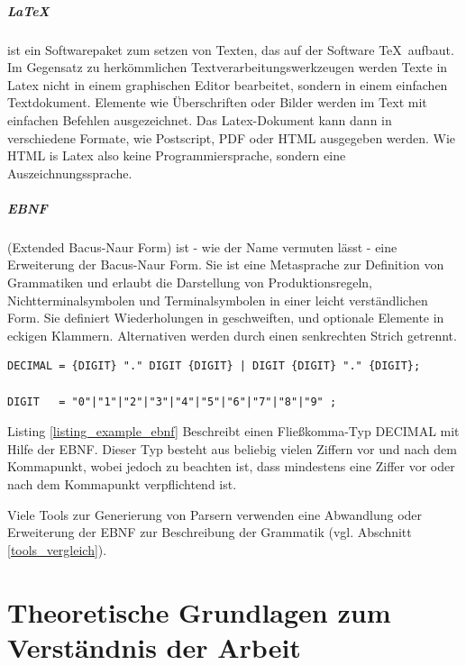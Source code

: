 \paragraph*{\LaTeX} ist ein Softwarepaket zum setzen von Texten, das auf der Software \TeX \ aufbaut. Im Gegensatz zu herkömmlichen Textverarbeitungswerkzeugen werden Texte in Latex nicht in einem graphischen Editor bearbeitet, sondern in einem einfachen Textdokument. Elemente wie Überschriften oder Bilder werden im Text mit einfachen Befehlen ausgezeichnet. Das Latex-Dokument kann dann in verschiedene Formate, wie Postscript, PDF oder HTML ausgegeben werden. Wie HTML is Latex also keine Programmiersprache, sondern eine Auszeichnungssprache.


\paragraph*{EBNF}
(Extended Bacus-Naur Form) ist - wie der Name vermuten lässt - eine Erweiterung der Bacus-Naur Form. Sie ist eine Metasprache zur Definition von Grammatiken und erlaubt die Darstellung von Produktionsregeln, Nichtterminalsymbolen und Terminalsymbolen in einer leicht verständlichen Form\cite{NiWi77}. Sie definiert Wiederholungen in geschweiften, und optionale Elemente in eckigen Klammern. Alternativen werden durch einen senkrechten Strich getrennt. 

\begin{lstlisting}[float = htbp,caption={Beschreibung eines Fließkomma-Typs in EBNF.},label=listing_example_ebnf]
DECIMAL = {DIGIT} "." DIGIT {DIGIT} | DIGIT {DIGIT} "." {DIGIT};

DIGIT   = "0"|"1"|"2"|"3"|"4"|"5"|"6"|"7"|"8"|"9" ;
\end{lstlisting}

Listing \ref{listing_example_ebnf} Beschreibt einen Fließkomma-Typ DECIMAL mit Hilfe der EBNF. Dieser Typ besteht aus beliebig vielen Ziffern vor und nach dem Kommapunkt, wobei jedoch zu beachten ist, dass mindestens eine Ziffer vor oder nach dem Kommapunkt verpflichtend ist.

Viele Tools zur Generierung von Parsern verwenden eine Abwandlung oder Erweiterung der EBNF zur Beschreibung der Grammatik (vgl. Abschnitt \ref{tools_vergleich}).




\chapter{Theoretische Grundlagen zum Verständnis der Arbeit}

